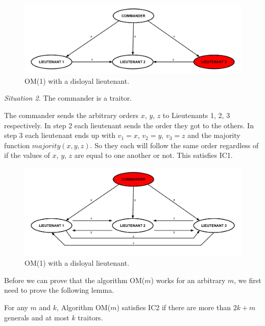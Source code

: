 \documentclass[10pt]{amsart}
\begin{document}
\begin{figure}[h!]
    \centering
    \includegraphics[scale=.4]{../figures/oral_messages_OM(1)_loyal_commander.pdf}
    \caption{OM(1) with a disloyal lieutenant.}
\end{figure}

\pagebreak

\noindent \emph{Situation 2.} The commander is a traitor. 

\begin{minipage}{.95\textwidth}%
    The commander sends the arbitrary orders $x$, $y$, $z$ to Lieutenants 1, 2, 3 respectively. In step 2 each
    lieutenant sends the order they got to the others. In step 3 each lieutenant ends up with $v_1=x$,
    $v_2=y$, $v_3=z$ and the majority function $majority(x,y,z)$. So they each will follow the same order
    regardless of if the values of $x$, $y$, $z$ are equal to one another or not. This satisfies IC1.
\end{minipage}%

\begin{figure}[h!]
    \centering
    \includegraphics[scale=.4]{../figures/oral_messages_OM(1)_unloyal_commander.pdf}
    \caption{OM(1) with a disloyal lieutenant.}
\end{figure}

Before we can prove that the algorithm OM($m$) works for an arbitrary $m$, we first need to prove the
following lemma.

\begin{lemma}
    \label{lemma1}
    For any $m$ and $k$, Algorithm OM($m$) satisfies IC2 if there are more than $2k+m$ generals and at
    most $k$ traitors.
\end{lemma}
\end{document}
